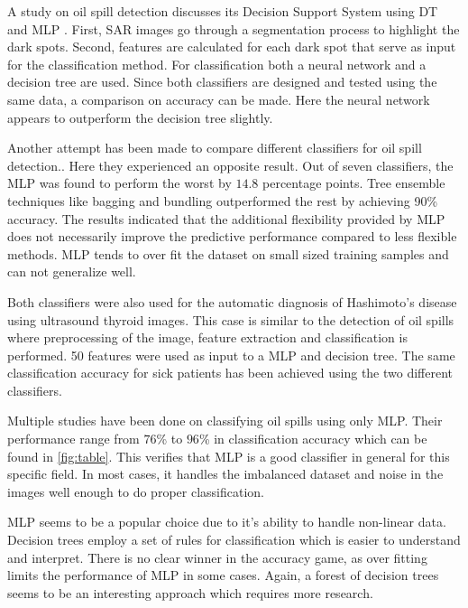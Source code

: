 A study on oil spill detection discusses its Decision Support System using DT and MLP \cite{Mera201472}. First, SAR images go through a segmentation process to highlight the dark spots. Second, features are calculated for each dark spot that serve as input for the classification method. For classification both a neural network and a decision tree are used. Since both classifiers are designed and tested using the same data, a comparison on accuracy can be made. Here the neural network appears to outperform the decision tree slightly.
	
Another attempt has been made to compare different classifiers for oil spill detection.\cite{Xu201414}. Here they experienced an opposite result. Out of seven classifiers, the MLP was found to perform the worst by $14.8$ percentage points. Tree ensemble techniques like bagging and bundling outperformed the rest by achieving 90\% accuracy. The results indicated that the additional flexibility provided by MLP does not necessarily improve the predictive performance compared to less flexible methods. MLP tends to over fit the dataset on small sized training samples and can not generalize well. 
	
Both classifiers were also used for the automatic diagnosis of Hashimoto's disease using ultrasound thyroid images\cite{Omiotek201340}. This case is similar to the detection of oil spills where preprocessing of the image, feature extraction and classification is performed. 50 features were used as input to a MLP and decision tree. The same classification accuracy for sick patients has been achieved using the two different classifiers.

Multiple studies \cite{Topouzelis200762, Delfrate200038, Topouzelis200930, Topouzelis200924, Delfrate2004} have been done on classifying oil spills using only MLP. Their performance range from $76$\% to $96$\% in classification accuracy which can be found in \ref{fig:table}. This verifies that MLP is a good classifier in general for this specific field. In most cases, it handles the imbalanced dataset and noise in the images well enough to do proper classification.

MLP seems to be a popular choice due to it's ability to handle non-linear data. Decision trees employ a set of rules for classification which is easier to understand and interpret. There is no clear winner in the accuracy game, as over fitting limits the performance of MLP in some cases. Again, a forest of decision trees seems to be an interesting approach which requires more research.






	